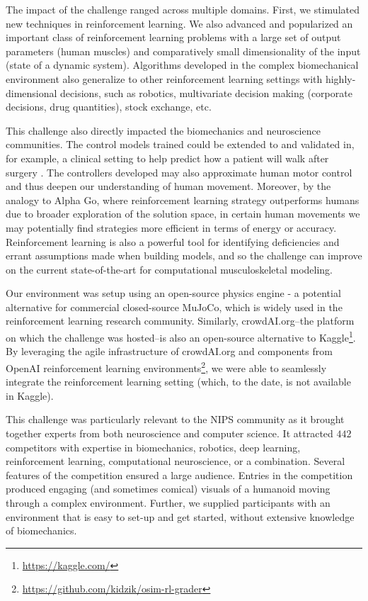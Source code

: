 \documentclass[graybox]{svmult}
\begin{document}
The impact of the challenge ranged across multiple domains. First, we stimulated new techniques in reinforcement learning. We also advanced and popularized an important class of reinforcement learning problems with a large set of output parameters (human muscles) and comparatively small dimensionality of the input (state of a dynamic system). Algorithms developed in the complex biomechanical environment also generalize to other reinforcement learning settings with highly-dimensional decisions, such as robotics, multivariate decision making (corporate decisions, drug quantities), stock exchange, etc.

This challenge also directly impacted the biomechanics and neuroscience communities. The control models trained could be extended to and validated in, for example, a clinical setting to help predict how a patient will walk after surgery \cite{ackermann2010optimality}. The controllers developed may also approximate human motor control and thus deepen our understanding of human movement. Moreover, by the analogy to Alpha Go, where reinforcement learning strategy outperforms humans \cite{silver2017mastering} due to broader exploration of the solution space, in certain human movements we may potentially find strategies more efficient in terms of energy or accuracy. Reinforcement learning is also a powerful tool for identifying deficiencies and errant assumptions made when building models, and so the challenge can improve on the current state-of-the-art for computational musculoskeletal modeling.

Our environment was setup using an open-source physics engine - a potential alternative for commercial closed-source MuJoCo, which is widely used in the reinforcement learning research community. Similarly, crowdAI.org--the platform on which the challenge was hosted--is also an open-source alternative to Kaggle\footnote{\url{https://kaggle.com/}}. By leveraging the agile infrastructure of crowdAI.org and components from OpenAI reinforcement learning environments\footnote{\url{https://github.com/kidzik/osim-rl-grader}}, we were able to seamlessly integrate the reinforcement learning setting (which, to the date, is not available in Kaggle).

This challenge was particularly relevant to the NIPS community as it brought together experts from both neuroscience and computer science. It attracted $442$ competitors with expertise in biomechanics, robotics, deep learning, reinforcement learning, computational neuroscience, or a combination. Several features of the competition ensured a large audience. Entries in the competition produced engaging (and sometimes comical) visuals of a humanoid moving through a complex environment. Further, we supplied participants with an environment that is easy to set-up and get started, without extensive knowledge of biomechanics.
\end{document}
